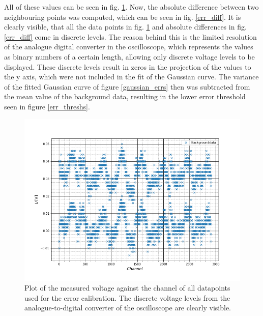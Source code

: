 All of these values can be seen in fig. \ref{all_err}. Now, the absolute difference between two neighbouring points was computed, which can be seen in fig. \ref{err_diff}. It is clearly visible, that all the data points in fig. \ref{all_err} and absolute differences in fig. \ref{err_diff} come in discrete levels. The reason behind this is the limited resolution of the analogue digital converter in the oscilloscope, which represents the values as binary numbers of a certain length, allowing only discrete voltage levels to be displayed. 
These discrete levels result in zeros in the projection of the values to the y axis, which were not included in the fit of the Gaussian curve. 
The variance of the fitted Gaussian curve of figure \ref{gaussian_errs} then was subtracted from the mean value of the background data, resulting in the lower error threshold seen in figure \ref{err_threshs}.

\begin{figure}[h]
	\includegraphics[scale=0.5]{Bild/all_bkg}
	\centering
	\caption[Plot of all background datapoints]{Plot of the measured voltage against the channel of all datapoints used for the error calibration. The discrete voltage levels from the analogue-to-digital converter of the oscilloscope are clearly visible.}
	\label{all_err}
\end{figure}

